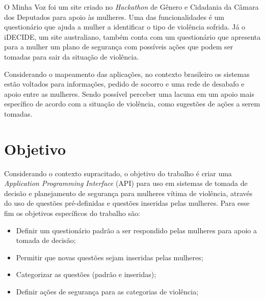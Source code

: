 O Minha Voz foi um site criado no \textit{Hackathon} de Gênero e Cidadania da Câmara dos Deputados para apoio
às mulheres. Uma das funcionalidades é um questionário que ajuda a mulher a identificar o tipo de violência sofrida.
Já o iDECIDE, um site australiano, também conta com um questionário que apresenta para a mulher um plano de segurança 
com possíveis ações que podem ser tomadas para sair da situação de violência.

Considerando o mapeamento das aplicações, no contexto brasileiro os sistemas estão voltados para informações,
pedido de socorro e uma rede de desabafo e apoio entre as mulheres. Sendo possível perceber uma lacuna em um apoio
mais específico de acordo com a situação de violência, como sugestões de ações a serem tomadas. 

\section{Objetivo}

Considerando o contexto supracitado, o objetivo do trabalho é criar uma \textit{Application Programming Interface} (API) para uso em sistemas de tomada de decisão e planejamento de segurança para mulheres vítima de violência, através do uso de questões pré-definidas e questões inseridas pelas mulheres. 
Para esse fim os objetivos específicos do trabalho são:
\begin{itemize}
	\item Definir um questionário padrão a ser respondido pelas mulheres para apoio a tomada de decisão;
	\item Permitir que novas questões sejam inseridas pelas mulheres;
	\item Categorizar as questões (padrão e inseridas);
	\item Definir ações de segurança para as categorias de violência;
\end{itemize}






